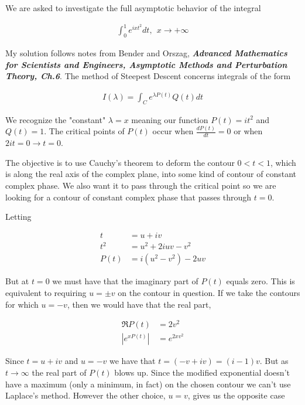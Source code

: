 \documentclass[paper=a4, fontsize=11pt]{scrartcl} %
\numberwithin{equation}{section} %
\numberwithin{figure}{section} %
\numberwithin{table}{section} %
\begin{document}
We are asked to investigate the full asymptotic behavior of the integral

\begin{align}
\int_0^1 e^{i x t^2} dt, \ \ x \rightarrow + \infty
\end{align}

My solution follows notes from Bender and Orszag, \textbf{\textit{Advanced Mathematics for Scientists and Engineers, Asymptotic Methods and Perturbation Theory, Ch.6}}. The method of Steepest Descent concerns integrals of the form 

\begin{align}
I(\lambda) = \int_{C} e^{\lambda P(t)}Q(t) dt
\end{align}

We recognize the "constant" $\lambda = x$ meaning our function $P(t) = i t^2$ and $Q(t) = 1$. The critical points of $P(t)$ occur when $\frac{dP(t)}{dt} = 0$ or when $2 i t = 0 \rightarrow t=0$. 

\hspace{2mm}

The objective is to use Cauchy's theorem to deform the contour $0 < t < 1$, which is along the real axis of the complex plane, into some kind of contour of constant complex phase. We also want it to pass through the critical point so we are looking for a contour of constant complex phase that passes through $t=0$.

Letting 

\begin{align}
t &= u + iv \\
t^2 &= u^2 + 2 i u v - v^2 \\
P(t) &= i(u^2 - v^2) - 2 u v
\end{align}

But at $t = 0$ we must have that the imaginary part of $P(t)$ equals zero. This is equivalent to requiring $u = \pm v$ on the contour in question. If we take the contours for which $u = -v$, then we would have that the real part, 

\begin{align}
\Re{P(t)} &= 2v^2 \\
|e^{xP(t)}| &= e^{2xv^2} 
\end{align} 

Since $t = u + iv$ and $u = -v$ we have that $t = (-v + iv) = (i - 1)v$. But as $t \rightarrow \infty$ the real part of $P(t)$ blows up. Since the modified exponential doesn't have a maximum (only a minimum, in fact) on the chosen contour we can't use Laplace's method. However the other choice, $u = v$, gives us the opposite case
\end{document}
